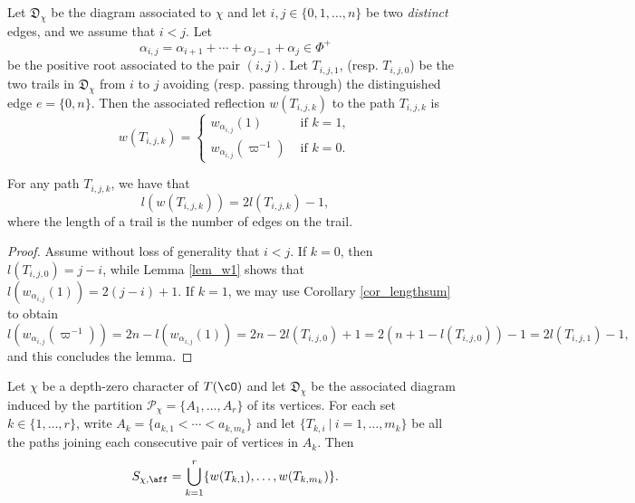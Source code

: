     \begin{definition}
        Let $\mathfrak{D}_\chi$ be the diagram associated to $\chi$ and let $i,j\in\{0,1,\ldots,n\}$ be two \textit{distinct} edges, and we assume that $i<j$. Let 
        $$\alpha_{i,j}=\alpha_{i+1}+\cdots+\alpha_{j-1}+\alpha_j\in\Phi^+$$
        be the positive root associated to the pair $(i,j)$. Let $T_{i,j,1}$, (resp. $T_{i,j,0}$) be the two trails in $\mathfrak{D}_\chi$ from $i$ to $j$ avoiding (resp. passing through) the distinguished edge $e=\{0,n\}$. Then the associated reflection $w(T_{i,j,k})$ to the path $T_{i,j,k}$ is
        \begin{equation*}
            w(T_{i,j,k})=
            \begin{cases}
                w_{\alpha_{i,j}}(1) &\text{ if } k=1,\\
                w_{\alpha_{i,j}}(\varpi^{-1}) &\text{ if } k=0.
            \end{cases}
        \end{equation*}
    \end{definition}

    \begin{lemma}
        For any path $T_{i,j,k}$, we have that 
        $$l(w(T_{i,j,k}))=2l(T_{i,j,k})-1,$$
        where the length of a trail is the number of edges on the trail.
    \end{lemma}
    \begin{proof}
        Assume without loss of generality that $i<j$. 
        If $k=0$, then $l(T_{i,j,0})=j-i$, while Lemma \ref{lem_w1} shows that $l(w_{\alpha_{i,j}}(1))=2(j-i)+1$. If $k=1$, we may use Corollary \ref{cor_lengthsum} to obtain
        $$l(w_{\alpha_{i,j}}(\varpi^{-1}))=2n-l(w_{\alpha_{i,j}}(1))=2n-2l(T_{i,j,0})+1=2(n+1-l(T_{i,j,0}))-1=2l(T_{i,j,1})-1,$$
        and this concludes the lemma.
    \end{proof}

    \begin{proposition}
        Let $\chi$ be a depth-zero character of $T(\cO)$ and let $\mathfrak{D}_\chi$ be the associated diagram induced by the partition $\mathcal{P}_\chi=\{A_1,\ldots,A_r\}$ of its vertices. For each set $k\in\{1,\ldots,r\}$, write $A_k=\{a_{k,1}<\cdots<a_{k,m_k}\}$ and let $\{T_{k,i}\ |\ i=1,\ldots,m_k\}$ be all the paths joining each consecutive pair of vertices in $A_k$. Then
        \begin{equation*}
            S_{\chi,\aff}=\bigcup_{k=1}^r \{w(T_{k,1}),\ldots,w(T_{k,m_k})\}.
        \end{equation*}
    \end{proposition}


